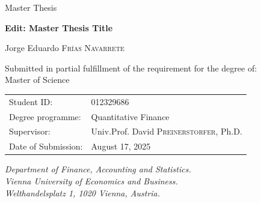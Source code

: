 \documentclass[
  12pt,
  a4paper,
  openany]{scrbook}
\begin{document}
\begin{center}
    \large Master Thesis \\
    \vspace{1cm}

    \textbf{\huge Edit: Master Thesis Title} \\
    \vspace{0.5cm}

        \LARGE Jorge Eduardo \textsc{Frías Navarrete} \\
    \vspace{0.5cm}
        \vspace{2cm}
    
    \normalsize Submitted in partial fulfillment of the requirement for the degree of: \\
    \LARGE Master of Science \\
\vspace{2cm}

\normalsize
    \begin{tabular}{ll}
        Student ID: & 012329686 \\
        Degree programme: & Quantitative Finance \\
        Supervisor: & Univ.Prof. David \textsc{Preinerstorfer}, Ph.D. \\
        Date of Submission: & August 17, 2025
    \end{tabular}
    \vspace{2cm}
    
    \textit{
      Department of Finance, Accounting and Statistics. \\
      Vienna University of Economics and Business. \\
      Welthandelsplatz 1, 1020 Vienna, Austria.
    }

\end{center}

\restoregeometry


% 
\end{document}
